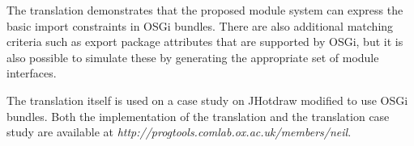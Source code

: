 The translation demonstrates that the proposed module system can express the basic import
constraints in OSGi bundles. There are also additional matching criteria such as
export package attributes that are supported by OSGi, but it is also possible to simulate
these by generating the appropriate set of module interfaces.

The translation itself is used on a case study on JHotdraw modified to use OSGi bundles.
Both the implementation of the translation and the translation case study are available at
\textit{http://progtools.comlab.ox.ac.uk/members/neil}.